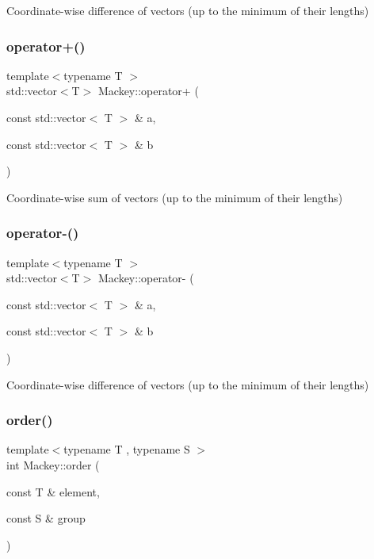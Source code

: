 Coordinate-\/wise difference of vectors (up to the minimum of their lengths) 

\mbox{\label{namespaceMackey_adb4974b5ffe533abb955ccb6b9096155}} 
\subsubsection{\texorpdfstring{operator+()}{operator+()}}
{\footnotesize\ttfamily template$<$typename T $>$ \\
std\+::vector$<$T$>$ Mackey\+::operator+ (\begin{DoxyParamCaption}\item[{const std\+::vector$<$ T $>$ \&}]{a,  }\item[{const std\+::vector$<$ T $>$ \&}]{b }\end{DoxyParamCaption})}



Coordinate-\/wise sum of vectors (up to the minimum of their lengths) 

\mbox{\label{namespaceMackey_ae86e49097ef9a09ebcd0173881e88786}} 
\subsubsection{\texorpdfstring{operator-\/()}{operator-()}}
{\footnotesize\ttfamily template$<$typename T $>$ \\
std\+::vector$<$T$>$ Mackey\+::operator-\/ (\begin{DoxyParamCaption}\item[{const std\+::vector$<$ T $>$ \&}]{a,  }\item[{const std\+::vector$<$ T $>$ \&}]{b }\end{DoxyParamCaption})}



Coordinate-\/wise difference of vectors (up to the minimum of their lengths) 

\mbox{\label{namespaceMackey_a4abdca157edcf425b1e7ceff39d74c2f}} 
\subsubsection{\texorpdfstring{order()}{order()}}
{\footnotesize\ttfamily template$<$typename T , typename S $>$ \\
int Mackey\+::order (\begin{DoxyParamCaption}\item[{const T \&}]{element,  }\item[{const S \&}]{group }\end{DoxyParamCaption})}



